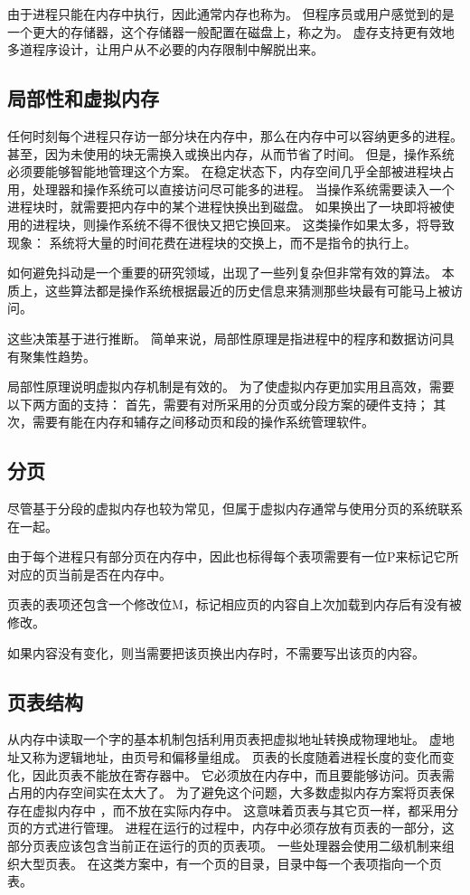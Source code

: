 {    由于进程只能在内存中执行，因此通常内存也称为。
    但程序员或用户感觉到的是一个更大的存储器，这个存储器一般配置在磁盘上，称之为。
    虚存支持更有效地多道程序设计，让用户从不必要的内存限制中解脱出来。

    \subsection{局部性和虚拟内存}
    {
        任何时刻每个进程只存访一部分块在内存中，那么在内存中可以容纳更多的进程。
        甚至，因为未使用的块无需换入或换出内存，从而节省了时间。
        但是，操作系统必须要能够智能地管理这个方案。
        在稳定状态下，内存空间几乎全部被进程块占用，处理器和操作系统可以直接访问尽可能多的进程。
        当操作系统需要读入一个进程块时，就需要把内存中的某个进程快换出到磁盘。
        如果换出了一块即将被使用的进程块，则操作系统不得不很快又把它换回来。
        这类操作如果太多，将导致现象：
        系统将大量的时间花费在进程块的交换上，而不是指令的执行上。

        如何避免抖动是一个重要的研究领域，出现了一些列复杂但非常有效的算法。
        本质上，这些算法都是操作系统根据最近的历史信息来猜测那些块最有可能马上被访问。

        这些决策基于进行推断。
        简单来说，局部性原理是指进程中的程序和数据访问具有聚集性趋势。

        局部性原理说明虚拟内存机制是有效的。
        为了使虚拟内存更加实用且高效，需要以下两方面的支持：
        首先，需要有对所采用的分页或分段方案的硬件支持；
        其次，需要有能在内存和辅存之间移动页和段的操作系统管理软件。
    }

    \subsection{分页}
    {
        尽管基于分段的虚拟内存也较为常见，但属于虚拟内存通常与使用分页的系统联系在一起。

        由于每个进程只有部分页在内存中，因此也标得每个表项需要有一位P来标记它所对应的页当前是否在内存中。

        页表的表项还包含一个修改位M，标记相应页的内容自上次加载到内存后有没有被修改。

        如果内容没有变化，则当需要把该页换出内存时，不需要写出该页的内容。
    }

    \subsection{页表结构}
    {
        从内存中读取一个字的基本机制包括利用页表把虚拟地址转换成物理地址。
        虚地址又称为逻辑地址，由页号和偏移量组成。
        页表的长度随着进程长度的变化而变化，因此页表不能放在寄存器中。
        它必须放在内存中，而且要能够访问。页表需占用的内存空间实在太大了。
        为了避免这个问题，大多数虚拟内存方案将页表保存在虚拟内存中 ，而不放在实际内存中。
        这意味着页表与其它页一样，都采用分页的方式进行管理。
        进程在运行的过程中，内存中必须存放有页表的一部分，这部分页表应该包含当前正在运行的页的页表项。
        一些处理器会使用二级机制来组织大型页表。
        在这类方案中，有一个页的目录，目录中每一个表项指向一个页表。

}}
